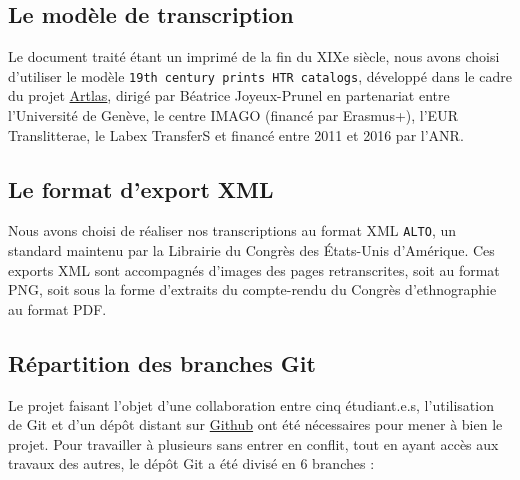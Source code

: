 \documentclass{article}
\begin{document}
	\subsection{Le modèle de transcription}
	
	Le document traité étant un imprimé de la fin du XIXe siècle, nous avons choisi d'utiliser le modèle \texttt{19th century prints HTR catalogs}, développé dans le cadre du projet \href{https://artlas.huma-num.fr/fr/}{Artlas}, dirigé par Béatrice Joyeux-Prunel en partenariat entre l'Université de Genève, le centre IMAGO (financé par Erasmus+), l'EUR Translitterae, le Labex TransferS et financé entre 2011 et 2016 par l'ANR.
	
	
	\subsection{Le format d'export XML}
	
	Nous avons choisi de réaliser nos transcriptions au format XML \texttt{ALTO}, un standard maintenu par la Librairie du Congrès des États-Unis d'Amérique. Ces exports XML sont accompagnés d'images des pages retranscrites, soit au format PNG, soit sous la forme d'extraits du compte-rendu du Congrès d'ethnographie au format PDF.
 	
	\subsection{Répartition des branches Git}
	
	Le projet faisant l'objet d'une collaboration entre cinq étudiant.e.s, l'utilisation de Git et d'un dépôt distant sur \href{https://github.com/kat-kel/TNAH-2021-Expositions_Universelles/}{Github} ont été nécessaires pour mener à bien le projet. Pour travailler à plusieurs sans entrer en conflit, tout en ayant accès aux travaux des autres, le dépôt Git a été divisé en 6 branches :
	
\end{document}
